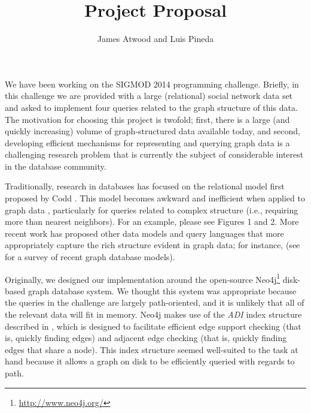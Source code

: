 \documentclass{article}
\title{Project Proposal}
\author{
James Atwood and Luis Pineda \\ %
}
\begin{document}
\maketitle

We have been working on the SIGMOD 2014 programming challenge.  Briefly,
in this challenge we are provided with a large (relational) social
network data set and asked to implement four queries related to the
graph structure of this data.  The motivation for choosing this
project is twofold; first, there is a large (and quickly increasing)
volume of graph-structured data available today, and second,
developing efficient mechanisms for representing and querying graph
data is a challenging research problem that is currently the subject
of considerable interest in the database community.

Traditionally, research in databases has focused on the relational
model first proposed by Codd \cite{codd1970relational}.  This model
becomes awkward and inefficient when applied to graph data
\cite{rodriguez2011graph}, particularly for queries related to
complex structure (i.e., requiring more than nearest neighbors).  For
an example, please see \cite{he2008graphs} Figures 1 and 2.  More
recent work has proposed other data models and query languages that
more appropriately capture the rich structure evident in graph data;
for instance,
\cite{he2008graphs,sun2012efficient,low2010graphlab} (see
\cite{angles2008survey} for a survey of recent graph database
models).  


Originally, we designed our implementation around the open-source
Neo4j\footnote{\url{http://www.neo4j.org/}} disk-based graph database
system.  We thought this system was appropriate because the queries in
the challenge are largely path-oriented, and it is unlikely that all
of the relevant data will fit in memory.  Neo4j makes use of the
\emph{ADI} index structure \cite[Chapter~6]{IanRobinson:2013ul}
described in \cite{wang2004scalable}, which is designed to facilitate
efficient edge support checking (that is, quickly finding edges) and
adjacent edge checking (that is, quickly finding edges that share a
node).  This index structure seemed well-suited to the task at hand
because it allows a graph on disk to be efficiently queried with
regards to path.
\end{document}
